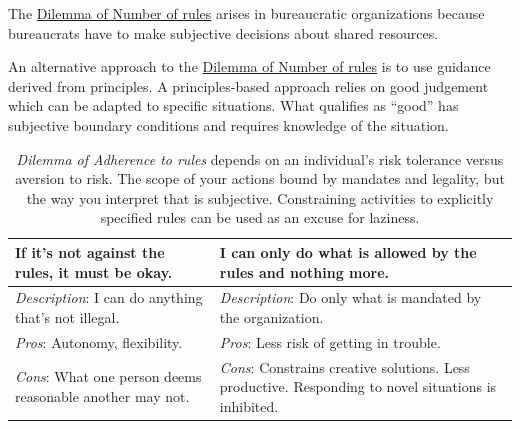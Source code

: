The \hyperref[table:dilemma-personal-number-of-rules]{Dilemma of Number of rules}
arises in bureaucratic organizations because bureaucrats have to make subjective decisions about shared resources. 


An alternative approach to the  \hyperref[table:dilemma-personal-number-of-rules]{Dilemma of Number of rules}
is to use guidance derived from principles. A principles-based approach relies on good judgement which can be adapted to specific situations. What qualifies as ``good'' has subjective boundary conditions and requires knowledge of the situation.



\begin{center}
\begin{table}[H] %
\begin{tabular}{ | m{\dilemmatablewidth}| m{\dilemmatablewidth} | } 
  \hline
  \textbf{If it's not against the rules, it must be okay.} & 
  \textbf{I can only do what is allowed by the rules and nothing more.} \\ 
  \hline
  \textit{Description}: I can do anything that's not illegal. &
  \textit{Description}: Do only what is mandated by the organization. \\
  \hline
  \textit{Pros}: Autonomy, flexibility. &
  \textit{Pros}: Less risk of getting in trouble. \\
  \hline
  \textit{Cons}: What one person deems reasonable another may not. & 
  \textit{Cons}: Constrains creative solutions. Less productive. Responding to novel situations is inhibited. \\  
  \hline
\end{tabular}
\caption{
\textit{Dilemma of Adherence to rules} depends on an individual's risk tolerance versus aversion to risk. 
The scope of your actions bound by mandates and legality, but the way you interpret that is subjective. 
Constraining activities to explicitly specified rules can be used as an excuse for laziness. 
}
\label{table:dilemma-personal-rule-adherence}
\end{table}
\end{center}

